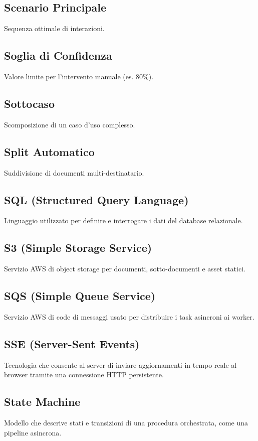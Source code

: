 \documentclass[a4paper,12pt]{article}
\begin{document}
\subsection{Scenario Principale}
Sequenza ottimale di interazioni.

\subsection{Soglia di Confidenza}
Valore limite per l'intervento manuale (es. 80\%).

\subsection{Sottocaso}
Scomposizione di un caso d'uso complesso.

\subsection{Split Automatico}
Suddivisione di documenti multi-destinatario.

\subsection{SQL (Structured Query Language)}
Linguaggio utilizzato per definire e interrogare i dati del database relazionale.

\subsection{S3 (Simple Storage Service)}
Servizio AWS di object storage per documenti, sotto-documenti e asset statici.

\subsection{SQS (Simple Queue Service)}
Servizio AWS di code di messaggi usato per distribuire i task asincroni ai worker.

\subsection{SSE (Server-Sent Events)}
Tecnologia che consente al server di inviare aggiornamenti in tempo reale al browser tramite una connessione HTTP persistente.

\subsection{State Machine}
Modello che descrive stati e transizioni di una procedura orchestrata, come una pipeline asincrona.
\end{document}
